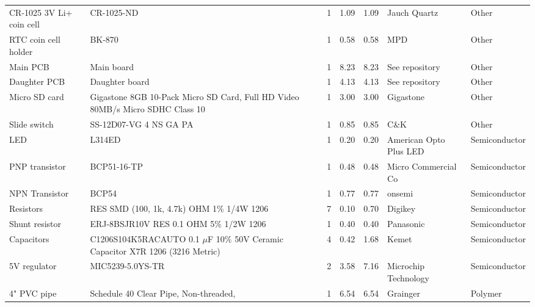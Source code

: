 \documentclass[11pt,letterpaper]{article}
\begin{document}
\begin{longtable}{ p{1.75cm} p{4cm} p{1.25cm} p{1cm} p{1cm} p{2cm} p{2.5cm} }
	\rowcolor[gray]{0.925}
	CR-1025 3V Li+ coin cell & CR-1025-ND & 1 & 1.09 & 1.09 & Jauch Quartz & Other \\
	
	RTC coin cell holder & BK-870 & 1 & 0.58 & 0.58 & MPD & Other \\
	
	\rowcolor[gray]{0.925}
	Main PCB & Main board & 1 & 8.23 & 8.23 & See repository & Other \\
	
	Daughter PCB & Daughter board & 1 & 4.13 & 4.13 & See repository & Other \\
	
	\rowcolor[gray]{0.925}
	Micro SD card & Gigastone 8GB 10-Pack Micro SD Card, Full HD Video 80MB/s Micro SDHC Class 10 & 1 & 3.00 & 3.00 & Gigastone & Other \\
	
	
	Slide switch & SS-12D07-VG 4 NS GA PA & 1 & 0.85 & 0.85 & C\&K & Other \\
	
	\rowcolor[gray]{0.925}
	LED & L314ED & 1 & 0.20 & 0.20 & American Opto Plus LED & Semiconductor \\
	
	
	PNP transistor & BCP51-16-TP & 1 & 0.48 & 0.48 & Micro Commercial Co & Semiconductor \\
	
	\rowcolor[gray]{0.925}
	NPN Transistor & BCP54 & 1 & 0.77 & 0.77 & onsemi & Semiconductor \\
	
	
	Resistors & RES SMD (100, 1k, 4.7k) OHM 1\% 1/4W 1206 & 7 & 0.10 & 0.70 & Digikey & Semiconductor \\
	
	\rowcolor[gray]{0.925}
	Shunt resistor & ERJ-8BSJR10V RES 0.1 OHM 5\% 1/2W 1206 & 1 & 0.40 & 0.40 & Panasonic & Semiconductor \\
	
	
	Capacitors & C1206S104K5RACAUTO 0.1 $\mu$F 10\% 50V Ceramic Capacitor X7R 1206 (3216 Metric) & 4 & 0.42 & 1.68 & Kemet & Semiconductor \\
	
	\rowcolor[gray]{0.925}
	5V regulator & MIC5239-5.0YS-TR & 2 & 3.58 & 7.16 & Microchip Technology & Semiconductor \\  
	
	
	4" PVC pipe & Schedule 40 Clear Pipe, Non-threaded,  & 1 & 6.54 & 6.54 & Grainger & Polymer \\  


\end{longtable}
\end{document}
